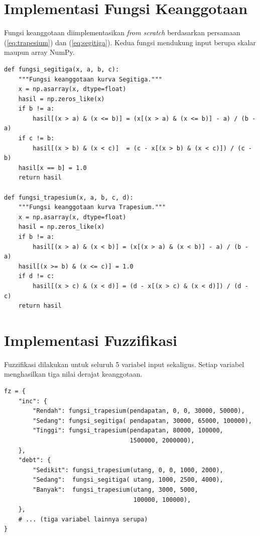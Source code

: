 \documentclass[12pt,a4paper]{report}
\begin{document}
\section{Implementasi Fungsi Keanggotaan}

Fungsi keanggotaan diimplementasikan \textit{from scratch}
berdasarkan persamaan (\ref{eq:trapesium}) dan
(\ref{eq:segitiga}). Kedua fungsi mendukung input berupa
skalar maupun array NumPy.

\begin{lstlisting}[caption={Implementasi fungsi keanggotaan Segitiga dan Trapesium}]
def fungsi_segitiga(x, a, b, c):
    """Fungsi keanggotaan kurva Segitiga."""
    x = np.asarray(x, dtype=float)
    hasil = np.zeros_like(x)
    if b != a:
        hasil[(x > a) & (x <= b)] = (x[(x > a) & (x <= b)] - a) / (b - a)
    if c != b:
        hasil[(x > b) & (x < c)]  = (c - x[(x > b) & (x < c)]) / (c - b)
    hasil[x == b] = 1.0
    return hasil

def fungsi_trapesium(x, a, b, c, d):
    """Fungsi keanggotaan kurva Trapesium."""
    x = np.asarray(x, dtype=float)
    hasil = np.zeros_like(x)
    if b != a:
        hasil[(x > a) & (x < b)] = (x[(x > a) & (x < b)] - a) / (b - a)
    hasil[(x >= b) & (x <= c)] = 1.0
    if d != c:
        hasil[(x > c) & (x < d)] = (d - x[(x > c) & (x < d)]) / (d - c)
    return hasil
\end{lstlisting}

\section{Implementasi Fuzzifikasi}

Fuzzifikasi dilakukan untuk seluruh 5 variabel input sekaligus.
Setiap variabel menghasilkan tiga nilai derajat keanggotaan.

\begin{lstlisting}[caption={Proses fuzzifikasi untuk semua variabel input}]
fz = {
    "inc": {
        "Rendah": fungsi_trapesium(pendapatan, 0, 0, 30000, 50000),
        "Sedang": fungsi_segitiga( pendapatan, 30000, 65000, 100000),
        "Tinggi": fungsi_trapesium(pendapatan, 80000, 100000,
                                   1500000, 2000000),
    },
    "debt": {
        "Sedikit": fungsi_trapesium(utang, 0, 0, 1000, 2000),
        "Sedang":  fungsi_segitiga( utang, 1000, 2500, 4000),
        "Banyak":  fungsi_trapesium(utang, 3000, 5000,
                                    100000, 100000),
    },
    # ... (tiga variabel lainnya serupa)
}
\end{lstlisting}
\end{document}

